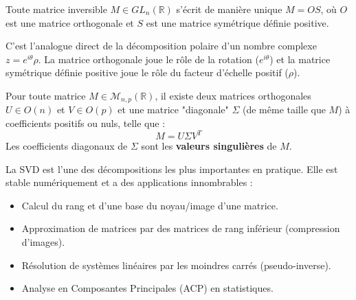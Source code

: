 \begin{theorem}
    Toute matrice inversible $M \in GL_n(\mathbb{R})$ s'écrit de manière unique $M=OS$, où $O$ est une matrice orthogonale et $S$ est une matrice symétrique définie positive.
\end{theorem}
\begin{remark}
    C'est l'analogue direct de la décomposition polaire d'un nombre complexe $z=e^{i\theta}\rho$. La matrice orthogonale joue le rôle de la rotation ($e^{i\theta}$) et la matrice symétrique définie positive joue le rôle du facteur d'échelle positif ($\rho$).
\end{remark}

\begin{theorem}
    Pour toute matrice $M \in \mathcal{M}_{n,p}(\mathbb{R})$, il existe deux matrices orthogonales $U \in O(n)$ et $V \in O(p)$ et une matrice "diagonale" $\Sigma$ (de même taille que $M$) à coefficients positifs ou nuls, telle que :
    $$ M = U \Sigma V^T $$
    Les coefficients diagonaux de $\Sigma$ sont les \textbf{valeurs singulières} de $M$.
\end{theorem}

\begin{application}
    La SVD est l'une des décompositions les plus importantes en pratique. Elle est stable numériquement et a des applications innombrables :
    \begin{itemize}
        \item Calcul du rang et d'une base du noyau/image d'une matrice.
        \item Approximation de matrices par des matrices de rang inférieur (compression d'images).
        \item Résolution de systèmes linéaires par les moindres carrés (pseudo-inverse).
        \item Analyse en Composantes Principales (ACP) en statistiques.
    \end{itemize}
\end{application}
